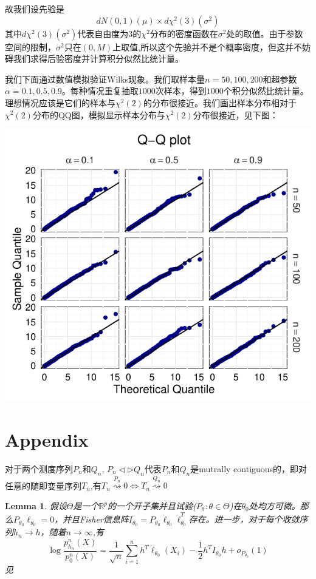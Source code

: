 \documentclass[review]{elsarticle}
\newtheorem{lemma}{Lemma}
\begin{document}
故我们设先验是
\begin{equation}
    dN(0,1)(\mu)\times d\chi^2(3)(\sigma^2)
\end{equation}
其中$d\chi^2(3)(\sigma^2)$代表自由度为$3$的$\chi^2$分布的密度函数在$\sigma^2$处的取值。由于参数空间的限制，$\sigma^2$只在$(0,M)$上取值,所以这个先验并不是个概率密度，但这并不妨碍我们求得后验密度并计算积分似然比统计量。

我们下面通过数值模拟验证Wilks现象。我们取样本量$n=50,100,200$和超参数$\alpha=0.1,0.5,0.9$。每种情况重复抽取$1000$次样本，得到$1000$个积分似然比统计量。理想情况应该是它们的样本与$\chi^2(2)$的分布很接近。我们画出样本分布相对于$\chi^2(2)$分布的QQ图，模拟显示样本分布与$\chi^2(2)$分布很接近，见下图：

\includegraphics{myQQPlot.pdf}






\section{Appendix}
对于两个测度序列$P_n$和$Q_n$, $P_n\triangleleft \triangleright Q_n$代表$P_n$和$Q_n$是mutrally contiguous的，即对任意的随即变量序列$T_n$,有$T_n\overset{P_n}{\rightsquigarrow}0\Leftrightarrow T_n\overset{Q_n}{\rightsquigarrow}0$
\begin{lemma}\label{lemmaEx}
    假设$\Theta$是一个$\mathbb{R}^p$的一个开子集并且试验($P_\theta: \theta \in\Theta$)在$\theta_0$处均方可微。那么$P_{\theta_0}\dot{\ell}_{\theta_0}=0$，并且Fisher信息阵$I_{\theta_0}=P_{\theta_0}\dot{\ell}_{\theta_0}\dot{\ell}_{\theta_0}^T$存在。进一步，对于每个收敛序列$h_n\to h$，随着$n\to \infty$,有
    \begin{equation}
        \log \frac{p^n_{h_n}(X)}{p^n_0(X)}=\frac{1}{\sqrt{n}}\sum^n_{i=1}h^T\dot{\ell}_{\theta_0}(X_i)-\frac{1}{2}h^TI_{\theta_0}h+o_{P_{\theta_0}}(1)
    \end{equation}
    见\cite{van2000asymptotic}
\end{lemma}
\end{document}
